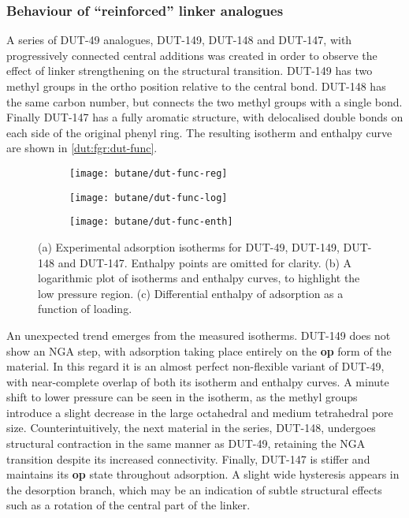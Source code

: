 \subsubsection{Behaviour of ``reinforced'' linker analogues}

A series of DUT-49 analogues, DUT-149, DUT-148 and DUT-147, 
with progressively connected central additions was created in
order to observe the effect of linker strengthening on the 
structural transition. DUT-149 has two methyl groups in the 
ortho position relative to the central bond. DUT-148 has 
the same carbon number, but connects the two methyl groups
with a single bond. Finally DUT-147 has a fully aromatic
structure, with delocalised double bonds on each side of the 
original phenyl ring. The resulting isotherm and enthalpy 
curve are shown in \autoref{dut:fgr:dut-func}.

\begin{figure}[htb]
    \centering
    \begin{subfigure}{0.33\linewidth}
        \texttt{[image: butane/dut-func-reg]}%
        \caption{}\label{dut:fgr:dut-func-reg}
    \end{subfigure}%
    \begin{subfigure}{0.33\linewidth}
        \texttt{[image: butane/dut-func-log]}%
        \caption{}\label{dut:fgr:dut-func-log}
    \end{subfigure}%
    \begin{subfigure}{0.33\linewidth}
        \texttt{[image: butane/dut-func-enth]}%
        \caption{}\label{dut:fgr:dut-func-enth}
    \end{subfigure}%
    \caption{(a) Experimental adsorption isotherms for DUT-49, DUT-149,
    DUT-148 and DUT-147. Enthalpy points are omitted for clarity. 
    (b) A logarithmic plot of isotherms and enthalpy curves,
    to highlight the low pressure region. 
    (c) Differential enthalpy of adsorption as a function of loading.}%
    \label{dut:fgr:dut-func}
\end{figure}

An unexpected trend emerges from the measured isotherms. DUT-149
does not show an NGA step, with adsorption taking place entirely
on the \textbf{op} form of the material. In this regard it is
an almost perfect non-flexible variant of DUT-49, with near-complete
overlap of both its isotherm and enthalpy curves. A minute 
shift to lower pressure can be seen in the isotherm, as the 
methyl groups introduce a slight decrease in the large octahedral
and medium tetrahedral pore size. Counterintuitively, the next material
in the series, DUT-148, undergoes structural contraction in the
same manner as DUT-49, retaining the NGA transition despite its 
increased connectivity. Finally, DUT-147 is stiffer and maintains
its \textbf{op} state throughout adsorption. A slight wide hysteresis
appears in the desorption branch, which may be an indication of 
subtle structural effects such as a rotation of the central part
of the linker.

